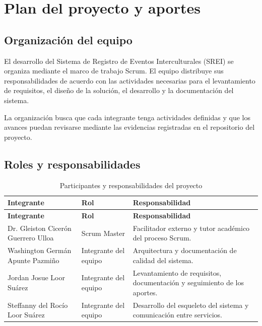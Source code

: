 
\section{Plan del proyecto y aportes}

\subsection{Organización del equipo}

El desarrollo del Sistema de Registro de Eventos Interculturales (SREI) se organiza mediante el marco de trabajo Scrum. El equipo distribuye sus responsabilidades de acuerdo con las actividades necesarias para el levantamiento de requisitos, el diseño de la solución, el desarrollo y la documentación del sistema.

La organización busca que cada integrante tenga actividades definidas y que los avances puedan revisarse mediante las evidencias registradas en el repositorio del proyecto.

\subsection{Roles y responsabilidades}

\begin{longtable}{P{0.28\textwidth} P{0.22\textwidth} P{0.40\textwidth}}
\caption{Participantes y responsabilidades del proyecto}\\
\toprule
\textbf{Integrante} & \textbf{Rol} & \textbf{Responsabilidad}\\
\midrule
\endfirsthead

\toprule
\textbf{Integrante} & \textbf{Rol} & \textbf{Responsabilidad}\\
\midrule
\endhead

Dr. Gleiston Cicerón Guerrero Ulloa &
Scrum Master &
Facilitador externo y tutor académico del proceso Scrum.\\

Washington Germán Apunte Pazmiño &
Integrante del equipo &
Arquitectura y documentación de calidad del sistema.\\

Jordan Josue Loor Suárez &
Integrante del equipo &
Levantamiento de requisitos, documentación y seguimiento de los aportes.\\

Steffanny del Rocío Loor Suárez &
Integrante del equipo &
Desarrollo del esqueleto del sistema y comunicación entre servicios.\\

\bottomrule
\end{longtable}

